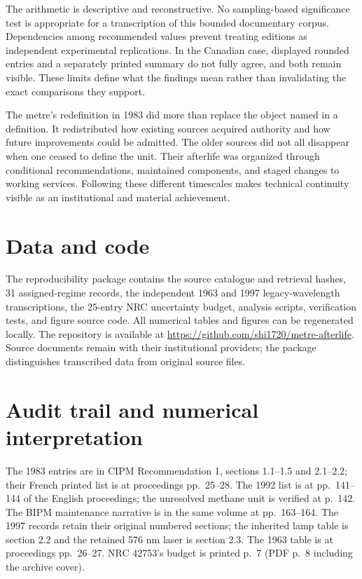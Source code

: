 \documentclass[11pt,a4paper]{article}
\begin{document}
The arithmetic is descriptive and reconstructive. No sampling-based significance test is appropriate for a transcription of this bounded documentary corpus. Dependencies among recommended values prevent treating editions as independent experimental replications. In the Canadian case, displayed rounded entries and a separately printed summary do not fully agree, and both remain visible. These limits define what the findings mean rather than invalidating the exact comparisons they support.

The metre's redefinition in 1983 did more than replace the object named in a definition. It redistributed how existing sources acquired authority and how future improvements could be admitted. The older sources did not all disappear when one ceased to define the unit. Their afterlife was organized through conditional recommendations, maintained components, and staged changes to working services. Following these different timescales makes technical continuity visible as an institutional and material achievement.

\section*{Data and code}
The reproducibility package contains the source catalogue and retrieval hashes, 31 assigned-regime records, the independent 1963 and 1997 legacy-wavelength transcriptions, the 25-entry NRC uncertainty budget, analysis scripts, verification tests, and figure source code. All numerical tables and figures can be regenerated locally. The repository is available at \url{https://github.com/shi1720/metre-afterlife}. Source documents remain with their institutional providers; the package distinguishes transcribed data from original source files.

\appendix
\section{Audit trail and numerical interpretation}
The 1983 entries are in CIPM Recommendation 1, sections 1.1--1.5 and 2.1--2.2; their French printed list is at proceedings pp.~25--28. The 1992 list is at pp.~141--144 of the English proceedings; the unresolved methane unit is verified at p.~142. The BIPM maintenance narrative is in the same volume at pp.~163--164. The 1997 records retain their original numbered sections; the inherited lamp table is section 2.2 and the retained 576 nm laser is section 2.3. The 1963 table is at proceedings pp.~26--27. NRC 42753's budget is printed p.~7 (PDF p.~8 including the archive cover).
\end{document}
